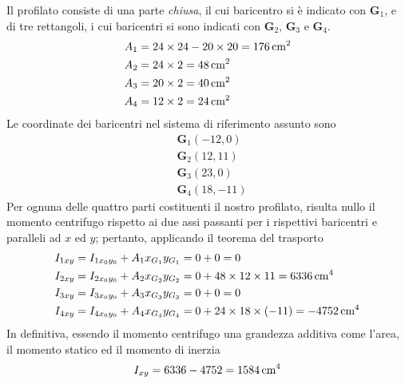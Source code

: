 \noindent Il profilato consiste di una parte \emph{chiusa}, il cui baricentro si è indicato con $\mathbf{G}_1$, e di tre rettangoli, i cui baricentri si sono indicati con $\mathbf{G}_2$, $\mathbf{G}_3$ e $\mathbf{G}_4$. 
\begin{align*}
A_1 &= 24\times 24 -20\times 20 = 176\,\textup{cm}^2 \\ 
A_2 &= 24\times 2 = 48\,\textup{cm}^2 \\ 
A_3 &= 20\times 2 = 40\,\textup{cm}^2 \\ 
A_4 &= 12\times 2 = 24\,\textup{cm}^2
\end{align*}
Le coordinate dei baricentri nel sistema di riferimento assunto sono
\begin{align*}
&\mathbf{G}_1(-12, 0) \\
&\mathbf{G}_2(12, 11) \\
&\mathbf{G}_3(23, 0) \\
&\mathbf{G}_4(18, -11) 
\end{align*}
Per ognuna delle quattro parti costituenti il nostro profilato, risulta nullo il momento centrifugo rispetto ai due assi passanti per i rispettivi baricentri e paralleli ad $x$ ed $y$; pertanto, applicando il teorema del trasporto
\begin{align*}
I_{1xy} &= I_{1x_{0}y_{0}}+A_{1}x_{G_{1}}y_{G_{1}} = 0+0 = 0 \\ 
I_{2xy} &= I_{2x_{0}y_{0}}+A_{2}x_{G_{2}}y_{G_{2}} = 0+48\times 12\times 11 = 6336\,\textup{cm}^4 \\ 
I_{3xy} &= I_{3x_{0}y_{0}}+A_{3}x_{G_{3}}y_{G_{3}} = 0+0 = 0 \\ 
I_{4xy} &= I_{4x_{0}y_{0}}+A_{4}x_{G_{4}}y_{G_{4}} = 0+24\times 18\times (-11) = -4752\,\textup{cm}^4
\end{align*}
In definitiva, essendo il momento centrifugo una grandezza additiva come l'area, il momento statico ed il momento di inerzia
\begin{equation*}
I_{xy} = 6336-4752 = 1584\,\textup{cm}^4
\end{equation*}
\clearpage
